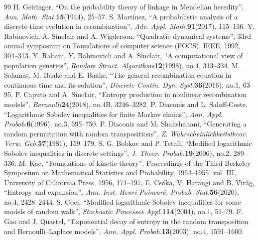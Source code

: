 \documentclass[10pt,a4paper]{amsart}
\theoremstyle{definition}
\theoremstyle{plain}
\numberwithin{equation}{section}
\begin{document}
\begin{thebibliography}{99}
 H. Geiringer, ``On the probability theory of linkage in Mendelian heredity'', \emph{Ann. Math. Stat.}\textbf{15}(1944), 25--57.
 S. Mart\'inez, ``A probabilistic analysis of a discrete-time evolution in recombination'', \emph{Adv. Appl. Math.}\textbf{91}(2017), 115--136.
 Y. Rabinovich, A. Sinclair and A. Wigderson, ``Quadratic dynamical systems'', 33rd annual symposium on Foundations of computer science (FOCS), IEEE, 1992, 304--313.
 Y. Rabani, Y. Rabinovich and A. Sinclair, ``A computational view of population genetics'', \emph{Random Struct. Algorithms}\textbf{12}(1998), no.4, 313--334.
 M. Salamat, M. Baake and E. Baake, ``The general recombination equation in continuous time and its solution'', \emph{Discrete Contin. Dyn. Syst.}\textbf{36}(2016), no.1, 63--95.
 P. Caputo and A. Sinclair, ``Entropy production in nonlinear recombination models'', \emph{Bernoulli}\textbf{24}(2018), no.4B, 3246--3282.
 P. Diaconis and L. Saloff-Coste, ``Logarithmic Sobolev inequalities for finite Markov chains'', \emph{Ann. Appl. Probab.}\textbf{6}(1996), no.3, 695--750.
 P. Diaconis and M. Shahshahani, ``Generating a random permutation with random transpositions'', \emph{Z. Wahrscheinlichkeitstheor. Verw. Geb.}\textbf{57}(1981), 159--179.
 S. G. Bobkov and P. Tetali, ``Modified logarithmic Sobolev inequalities in discrete settings'', \emph{J. Theor. Probab.}\textbf{19}(2006), no.2, 289--336.
 M. Kac, ``Foundations of kinetic theory'', Proceedings of the Third Berkeley Symposium on Mathematical Statistics and Probability, 1954--1955, vol. III, University of California Press, 1956, 171--197.
 E. Cs\'oka, V. Harangi and B. Vir\'ag, ``Entropy and expansion'', \emph{Ann. Inst. Henri Poincar\'e, Probab. Stat.}\textbf{56}(2020), no.4, 2428--2444.
 S. Goel, ``Modified logarithmic Sobolev inequalities for some models of random walk'', \emph{Stochastic Processes Appl.}\textbf{114}(2004), no.1, 51--79.
 F. Gao and J. Quastel, ``Exponential decay of entropy in the random transposition and Bernoulli--Laplace models'', \emph{Ann. Appl. Probab.}\textbf{13}(2003), no.4, 1591--1600.
\end{thebibliography}
\end{document}
